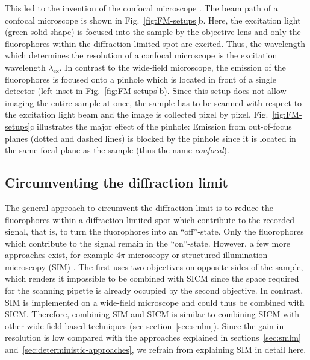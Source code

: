 This led to the invention of the confocal microscope
\cite{Heimstaedt1911,Minsky1988}. The beam path of a confocal microscope is
shown in Fig.~\ref{fig:FM-setups}b. Here, the excitation light (green solid
shape) is focused into the sample by the objective lens and only the
fluorophores within the diffraction limited spot are excited. Thus, the
wavelength which determines the resolution of a confocal microscope is the
excitation wavelength $\lambda_\text{ex}$.  In contrast to the wide-field
microscope, the emission of the fluorophores is focused onto a pinhole which
is located in front of a single detector (left inset in
Fig.~\ref{fig:FM-setups}b). Since this setup does not allow imaging the entire
sample at once, the sample has to be scanned with respect to the excitation
light beam and the image is collected pixel by
pixel. Fig.~\ref{fig:FM-setups}c illustrates the major effect of the pinhole:
Emission from out-of-focus planes (dotted and dashed lines) is blocked by the
pinhole since it is located in the same focal plane as the sample (thus the
name \emph{confocal}). 

\subsection{Circumventing the diffraction limit}
\label{sec:circumvent-diffraction-limit}
The general approach to circumvent the diffraction limit is to reduce the
fluorophores within a diffraction limited spot which contribute to the
recorded signal, that is, to turn the fluorophores into an ``off''-state. Only
the fluorophores which contribute to the signal remain in the ``on''-state.
However, a few more approaches exist, for example 4$\pi$-microscopy
\cite{Hell1994} or structured illumination microscopy (SIM)
\cite{Guerra1995}. The first uses two objectives on opposite sides of the
sample, which renders it impossible to be combined with SICM since the space
required for the scanning pipette is already occupied by the second
objective. In contrast, SIM is implemented on a wide-field microscope and
could thus be combined with SICM. Therefore, combining SIM and SICM is similar
to combining SICM with other wide-field based techniques (see
section~\ref{sec:smlm}). Since the gain in resolution is low compared with the
approaches explained in sections~\ref{sec:smlm}
and~\ref{sec:deterministic-approaches}, we refrain from explaining SIM in
detail here.


